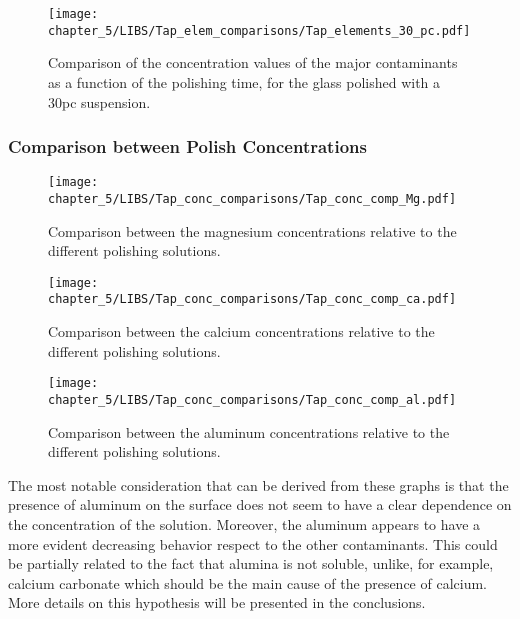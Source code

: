  
  \begin{figure}[H]
     \centering
     \texttt{[image: chapter\_5/LIBS/Tap\_elem\_comparisons/Tap\_elements\_30\_pc.pdf]} 
     \vspace*{-30pt}
     \caption{Comparison of the concentration values of the major contaminants as a function of the polishing time, for the glass polished with a 30pc suspension.}
     \label{fig:tap_elem_30pc}
  \end{figure}


\subsubsection{Comparison between Polish Concentrations}
\label{subsubsec:comp_between_pol_conc}


\begin{figure}[H]
   \centering
   \texttt{[image: chapter\_5/LIBS/Tap\_conc\_comparisons/Tap\_conc\_comp\_Mg.pdf]} 
   \vspace*{-30pt}
   \caption{Comparison between the magnesium concentrations relative to the different polishing solutions.}
   \label{fig:tap_conc_comp_mg}
\end{figure}

\begin{figure}[H]
   \centering
   \texttt{[image: chapter\_5/LIBS/Tap\_conc\_comparisons/Tap\_conc\_comp\_ca.pdf]} 
   \vspace*{-30pt}
   \caption{Comparison between the calcium concentrations relative to the different polishing solutions.}
   \label{fig:tap_conc_comp_ca}
\end{figure}

\begin{figure}[H]
   \centering
   \texttt{[image: chapter\_5/LIBS/Tap\_conc\_comparisons/Tap\_conc\_comp\_al.pdf]} 
   \vspace*{-30pt}
   \caption{Comparison between the aluminum concentrations relative to the different polishing solutions.}
   \label{fig:tap_conc_comp_al}
\end{figure}

The most notable consideration that can be derived from these graphs is that the presence of aluminum on the surface does not seem to have a clear dependence on the concentration of the solution. Moreover, the aluminum appears to have a more evident decreasing behavior respect to the other contaminants. This could be partially related to the fact that alumina is not soluble, unlike, for example, calcium carbonate which should be the main cause of the presence of calcium.
\\
More details on this hypothesis will be presented in the conclusions.

